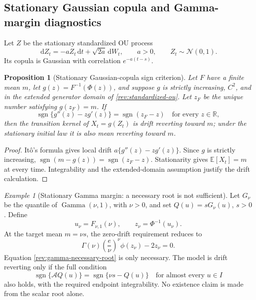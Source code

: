 \documentclass[11pt]{article}
\newtheorem{proposition}[definition]{Proposition}
\theoremstyle{remark}
\newtheorem{example}[definition]{Example}
\newcommand{\E}{\mathbb E}
\newcommand{\R}{\mathbb R}
\newcommand{\dd}{\,\mathrm d}
\newcommand{\sgn}{\operatorname{sgn}}
\newcommand{\Normal}{\mathcal N}
\newcommand{\Gam}{\operatorname{Gamma}}
\begin{document}
\subsection{Stationary Gaussian copula and Gamma-margin diagnostics}

Let $Z$ be the stationary standardized OU process
\begin{equation}
\dd Z_t=-aZ_t\dd t+\sqrt{2a}\dd W_t,\qquad a>0,\qquad Z_t\sim\Normal(0,1).
\label{rev:standardized-ou}
\end{equation}
Its copula is Gaussian with correlation $e^{-a(t-s)}$.

\begin{proposition}[Stationary Gaussian-copula sign criterion]
\label{rev:prop-stationary-gaussian}
Let $F$ have a finite mean $m$, let
$g(z)=F^{-1}(\Phi(z))$, and suppose $g$ is strictly increasing,
$C^2$, and in the extended generator domain of \eqref{rev:standardized-ou}.
Let $z_F$ be the unique number satisfying $g(z_F)=m$.  If
\begin{equation}
\sgn\{g''(z)-zg'(z)\}=\sgn(z_F-z)
\quad\text{for every }z\in\R,
\label{rev:stationary-gaussian-sign}
\end{equation}
then the transition kernel of $X_t=g(Z_t)$ is drift reverting toward $m$;
under the stationary initial law it is also mean reverting toward $m$.
\end{proposition}

\begin{proof}
It\^o's formula gives local drift
$a\{g''(z)-zg'(z)\}$.  Since $g$ is strictly increasing,
$\sgn(m-g(z))=\sgn(z_F-z)$.  Stationarity gives
$\E[X_t]=m$ at every time.  Integrability and the extended-domain assumption
justify the drift calculation.
\end{proof}

\begin{example}[Stationary Gamma margin: a necessary root is not sufficient]
\label{rev:ex-gamma-stationary}
Let $G_\nu$ be the quantile of $\Gam(\nu,1)$, with $\nu>0$, and set
$Q(u)=sG_\nu(u)$, $s>0$.  Define
\begin{equation}
u_\nu=F_{\nu,1}(\nu),\qquad z_\nu=\Phi^{-1}(u_\nu).
\label{rev:gamma-mean-quantile}
\end{equation}
At the target mean $m=\nu s$, the zero-drift requirement reduces to
\begin{equation}
\Gamma(\nu)\left(\frac e\nu\right)^\nu\phi(z_\nu)-2z_\nu=0.
\label{rev:gamma-necessary-root}
\end{equation}
Equation \eqref{rev:gamma-necessary-root} is only necessary.  The model is
drift reverting only if the full condition
\begin{equation}
\sgn\{\mathcal A Q(u)\}=\sgn\{\nu s-Q(u)\}
\quad\text{for almost every }u\in I
\label{rev:gamma-full-sign}
\end{equation}
also holds, with the required endpoint integrability.  No existence claim is
made from the scalar root alone.
\end{example}
\end{document}
